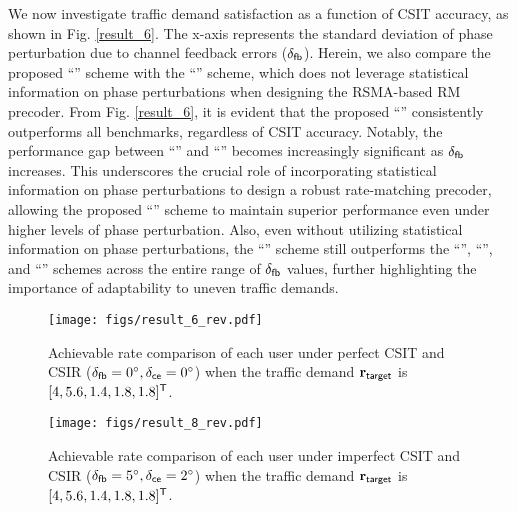 \documentclass[draftclsnofoot, onecolumn, comsoc, 12pt]{IEEEtran}
\begin{document}
{ We now investigate traffic demand satisfaction as a function of CSIT accuracy, as shown in Fig. \ref{result_6}. The x-axis represents the standard deviation of phase perturbation due to channel feedback errors ($\delta_{\sf{fb}}$). Herein, we also compare the proposed ``{}'' scheme with the ``{}'' scheme, which does not leverage statistical information on phase perturbations when designing the RSMA-based RM precoder.
From Fig. \ref{result_6}, it is evident that the proposed ``{}'' consistently outperforms all benchmarks, regardless of CSIT accuracy. Notably, the performance gap between ``{}'' and ``{}'' becomes increasingly significant as $\delta_{\sf{fb}}$ increases. This underscores the crucial role of incorporating statistical information on phase perturbations to design a robust rate-matching precoder, allowing the proposed ``{}'' scheme to maintain superior performance even under higher levels of phase perturbation. Also, even without utilizing statistical information on phase perturbations, the ``{}'' scheme still outperforms the ``{}'', ``{}'', and ``{}'' schemes across the entire range of $\delta_{\sf{fb}}$ values, further highlighting the importance of adaptability to uneven traffic demands.}

\begin{figure}[!t]
\centering
 		\texttt{[image: figs/result\_6\_rev.pdf]}%
 		\caption{{Achievable rate comparison of each user under perfect CSIT and CSIR ($\delta_{\sf{fb}}=0^{\circ}, \delta_{\sf{ce}}=0^{\circ}$) when the traffic demand $\mathbf{r}_{\sf{target}}$ is $[4, 5.6, 1.4, 1.8, 1.8]^{\sf{T}}$.}}
    	\label{result_7} %
\end{figure}

\begin{figure}[!t]
\centering
 		\texttt{[image: figs/result\_8\_rev.pdf]}%
 		\caption{{Achievable rate comparison of each user under imperfect CSIT and CSIR ($\delta_{\sf{fb}}=5^{\circ}, \delta_{\sf{ce}}=2^{\circ}$) when the traffic demand $\mathbf{r}_{\sf{target}}$ is $[4, 5.6, 1.4, 1.8, 1.8]^{\sf{T}}$.}}
    	\label{result_9} %
\end{figure}
\end{document}
